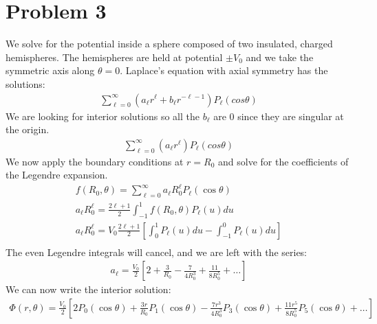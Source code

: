\documentclass[a4paper,12pt]{article}
\numberwithin{equation}{section}
\begin{document}
\section{Problem 3}
We solve for the potential inside a sphere composed of two insulated, charged hemispheres.
The hemispheres are held at potential $\pm V_0$ and we take the symmetric axis along $\theta=0$.
Laplace's equation with axial symmetry has the solutions:
\begin{gather}
 \sum_{\ell=0}^{\infty}(a_\ell r^\ell+b_\ell r^{-\ell-1} )P_\ell(cos \theta)
\end{gather}
We are looking for interior solutions so all the $b_\ell$ are 0 since they are singular at the origin.
\begin{gather}
 \sum_{\ell=0}^{\infty}(a_\ell r^\ell )P_\ell(cos \theta)
\end{gather}
We now apply the boundary conditions at $r=R_0$ and solve for the coefficients of the Legendre expansion.
\begin{gather}
 f(R_0,\theta)=\sum_{\ell=0}^{\infty}a_\ell R_0^{\ell}P_\ell(\cos \theta)\\
 a_\ell R_0^\ell=\frac{2\ell + 1}{2}\int_{-1}^{1}f(R_0,\theta)P_\ell(u) du\\
  a_\ell R_0^\ell=V_0\frac{2\ell + 1}{2}[\int_{0}^{1} P_\ell(u) du- \int_{-1}^{0} P_\ell(u) du ]\\
\end{gather}
The even Legendre integrals will cancel, and we are left with the series:
\begin{gather}
 a_\ell=\frac{V_0}{2}[2+\frac{3}{R_0}-\frac{7}{4R_0^3}+\frac{11}{8R_0^5}+\ldots]
\end{gather}
We can now write the interior solution:
\begin{gather}
 \Phi(r,\theta)=\frac{V_0}{2}[2P_0(\cos \theta)+\frac{3r}{R_0}P_1(\cos \theta)-\frac{7r^3}{4R_0^3}P_3(\cos \theta)+\frac{11r^5}{8R_0^5}P_5(\cos \theta)+\ldots]
\end{gather}
\end{document}
